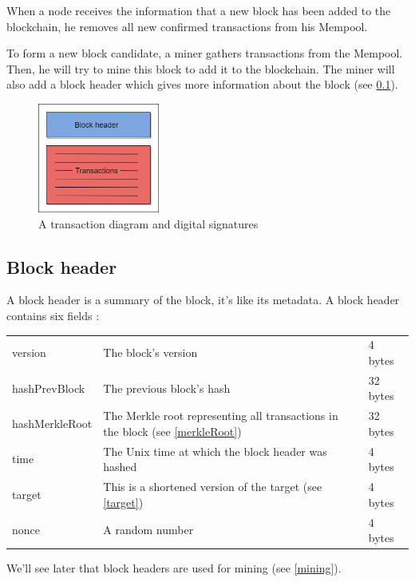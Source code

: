When a node receives the information that a new block has been added to the blockchain, he removes all new confirmed transactions from his Mempool.  \newline

To form a new block candidate, a miner gathers transactions from the Mempool. Then, he will try to mine this block to add it to the blockchain. The miner will also add a block header which gives more information about the block (see \ref{blockHeader}). \newline

\begin{figure}[h]
\centering
\includegraphics[width=4cm]{Figures/block}
\caption{A transaction diagram and digital signatures}
\end{figure}


  \subsection{Block header} \label{blockHeader}

A block header is a summary of the block, it's like its metadata. A block header contains six fields : \newline

\begin{tabular}{lll}
   version & The block's version & 4 bytes\\
   hashPrevBlock & The previous block's hash & 32 bytes \\
   hashMerkleRoot & The Merkle root representing all transactions in the block (see \ref{merkleRoot}) & 32 bytes \\
   time & The Unix time at which the block header was hashed & 4 bytes \\
   target & This is a shortened version of the target (see \ref{target}) & 4 bytes \\
   nonce & A random number  & 4 bytes \\
\end{tabular}

We'll see later that block headers are used for mining (see \ref{mining}).


